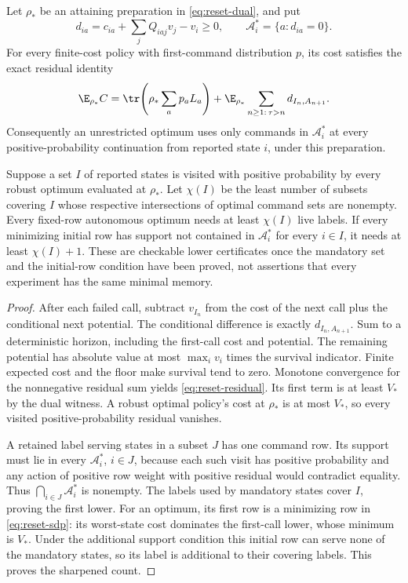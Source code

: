 \begin{proposition}\label{prop:reset-rigidity}
Let $\rho_*$ be an attaining preparation in \eqref{eq:reset-dual}, and put
\[
 d_{ia}=c_{ia}+\sum_jQ_{iaj}v_j-v_i\ge0,\qquad
 \mathcal A_i^*=\{a:d_{ia}=0\}.
\]
For every finite-cost policy with first-command distribution $p$, its cost satisfies the exact residual identity
\begin{equation}\label{eq:reset-residual}
 \E_{\rho_*}C
 =\tr\!\left(\rho_*\sum_a p_aL_a\right)
    +\E_{\rho_*}\sum_{n\ge1:\,\tau>n}d_{I_n,A_{n+1}}.
\end{equation}
Consequently an unrestricted optimum uses only commands in $\mathcal A_i^*$ at every positive-probability continuation from reported state $i$, under this preparation.

Suppose a set $I$ of reported states is visited with positive probability by every robust optimum evaluated at $\rho_*$. Let $\chi(I)$ be the least number of subsets covering $I$ whose respective intersections of optimal command sets are nonempty. Every fixed-row autonomous optimum needs at least $\chi(I)$ live labels. If every minimizing initial row has support not contained in $\mathcal A_i^*$ for every $i\in I$, it needs at least $\chi(I)+1$. These are checkable lower certificates once the mandatory set and the initial-row condition have been proved, not assertions that every experiment has the same minimal memory.
\end{proposition}
\begin{proof}
After each failed call, subtract $v_{I_n}$ from the cost of the next call plus the conditional next potential. The conditional difference is exactly $d_{I_n,A_{n+1}}$. Sum to a deterministic horizon, including the first-call cost and potential. The remaining potential has absolute value at most $\max_i v_i$ times the survival indicator. Finite expected cost and the floor make survival tend to zero. Monotone convergence for the nonnegative residual sum yields \eqref{eq:reset-residual}. Its first term is at least $V_*$ by the dual witness. A robust optimal policy's cost at $\rho_*$ is at most $V_*$, so every visited positive-probability residual vanishes.

A retained label serving states in a subset $J$ has one command row. Its support must lie in every $\mathcal A_i^*$, $i\in J$, because each such visit has positive probability and any action of positive row weight with positive residual would contradict equality. Thus $\bigcap_{i\in J}\mathcal A_i^*$ is nonempty. The labels used by mandatory states cover $I$, proving the first lower. For an optimum, its first row is a minimizing row in \eqref{eq:reset-sdp}: its worst-state cost dominates the first-call lower, whose minimum is $V_*$. Under the additional support condition this initial row can serve none of the mandatory states, so its label is additional to their covering labels. This proves the sharpened count.
\end{proof}

